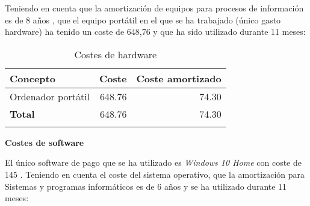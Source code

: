 Teniendo en cuenta que la amortización de equipos para procesos de información es de 8 años \cite{agencia_tributaria_tabla_2018}, que el equipo portátil en el que se ha trabajado (único gasto hardware) ha tenido un coste de 648,76 \officialeuro \thinspace y que ha sido utilizado durante 11 meses:

\begin{longtable}[]{@{}lrr@{}}
	\toprule
	\begin{minipage}[b]{0.29\columnwidth}\raggedright\strut
		\textbf{Concepto}\strut
	\end{minipage} & \begin{minipage}[b]{0.18\columnwidth}\raggedright\strut
		\textbf{Coste}\strut
	\end{minipage} & \begin{minipage}[b]{0.32\columnwidth}\raggedright\strut
		\textbf{Coste amortizado}\strut
	\end{minipage}\tabularnewline
	\midrule
	\endhead
	\begin{minipage}[t]{0.29\columnwidth}\raggedright\strut
		Ordenador portátil\strut
	\end{minipage} & \begin{minipage}[t]{0.18\columnwidth}\raggedright\strut
		648.76 \officialeuro\strut
	\end{minipage} & \begin{minipage}[t]{0.32\columnwidth}\raggedright\strut
		74.30 \officialeuro\strut
	\end{minipage}\tabularnewline
	\midrule
	\begin{minipage}[t]{0.29\columnwidth}\raggedright\strut
		\textbf{Total}\strut
	\end{minipage} & \begin{minipage}[t]{0.18\columnwidth}\raggedright\strut
		648.76 \officialeuro\strut
	\end{minipage} & \begin{minipage}[t]{0.32\columnwidth}\raggedright\strut
		74.30 \officialeuro\strut
	\end{minipage}\tabularnewline
	\bottomrule
	\caption{Costes de hardware}
\end{longtable}

\textbf{Costes de software}

El único software de pago que se ha utilizado es \textit{Windows 10 Home} con coste de 145 \officialeuro . Teniendo en cuenta el coste del sistema operativo, que la amortización para Sistemas y programas informáticos es de 6 años \cite{agencia_tributaria_tabla_2018} y se ha utilizado durante 11 meses:

